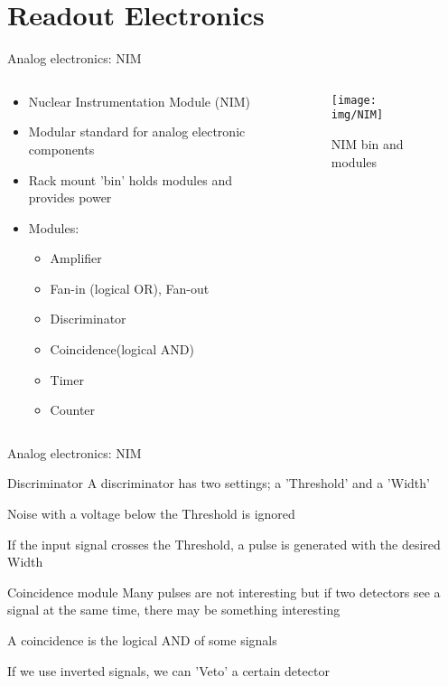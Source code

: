 \documentclass[9pt]{beamer}
\begin{document}
\section{Readout Electronics}
\begin{frame}{Analog electronics: NIM}
  \begin{columns}
    \begin{column}{.4\textwidth}
    \vspace*{-0.5cm}
    \begin{itemize}
        \item Nuclear Instrumentation Module (NIM)
        \item Modular standard for analog electronic components
        \item Rack mount 'bin' holds modules and provides power
        \item Modules:
        \begin{itemize}
            \item Amplifier
            \item Fan-in (logical OR), Fan-out
            \item Discriminator
            \item Coincidence\newline(logical AND)
            \item Timer
            \item Counter
        \end{itemize}
    \end{itemize}
    \end{column}
    \begin{column}{.6\textwidth}
    \vspace*{-0.5cm}
    \begin{figure}\texttt{[image: img/NIM]}\vspace*{-0.2cm}\caption{NIM bin and modules}\end{figure}\vspace*{-1cm}
    \end{column}
  \end{columns}
\end{frame}

\begin{frame}{Analog electronics: NIM}
  \begin{block}{Discriminator}
    A discriminator has two settings; a 'Threshold' and a 'Width'

    Noise with a voltage below the Threshold is ignored

    If the input signal crosses the Threshold, a pulse is generated with the desired Width
  \end{block}
  \begin{block}{Coincidence module}
    Many pulses are not interesting but if two detectors see a signal at the same time, there may be something interesting

    A coincidence is the logical AND of some signals

    If we use inverted signals, we can 'Veto' a certain detector
  \end{block}
\end{frame}
\end{document}
